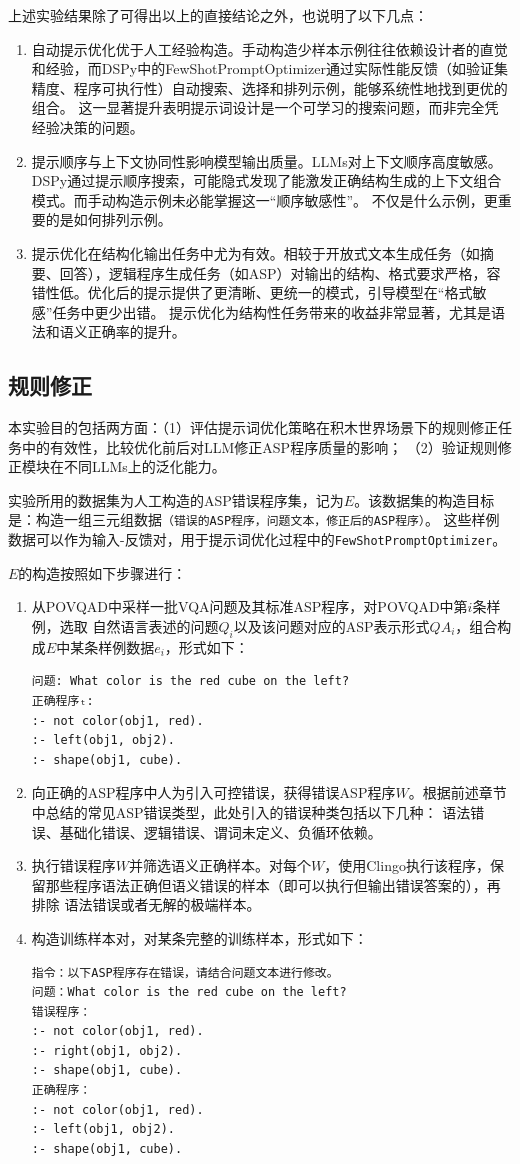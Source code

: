 上述实验结果除了可得出以上的直接结论之外，也说明了以下几点：
\begin{enumerate}[nosep]
\item 自动提示优化优于人工经验构造。手动构造少样本示例往往依赖设计者的直觉和经验，而DSPy中的FewShotPromptOptimizer通过实际性能反馈（如验证集精度、程序可执行性）自动搜索、选择和排列示例，能够系统性地找到更优的组合。
这一显著提升表明提示词设计是一个可学习的搜索问题，而非完全凭经验决策的问题。
\item 提示顺序与上下文协同性影响模型输出质量。LLMs对上下文顺序高度敏感。DSPy通过提示顺序搜索，可能隐式发现了能激发正确结构生成的上下文组合模式。而手动构造示例未必能掌握这一“顺序敏感性”。
不仅是什么示例，更重要的是如何排列示例。
\item 提示优化在结构化输出任务中尤为有效。相较于开放式文本生成任务（如摘要、回答），逻辑程序生成任务（如ASP）对输出的结构、格式要求严格，容错性低。优化后的提示提供了更清晰、更统一的模式，引导模型在“格式敏感”任务中更少出错。
提示优化为结构性任务带来的收益非常显著，尤其是语法和语义正确率的提升。
\end{enumerate}
\subsection{规则修正}
本实验目的包括两方面：（1）评估提示词优化策略在积木世界场景下的规则修正任务中的有效性，比较优化前后对LLM修正ASP程序质量的影响；
（2）验证规则修正模块在不同LLMs上的泛化能力。

实验所用的数据集为人工构造的ASP错误程序集，记为$E$。该数据集的构造目标是：构造一组三元组数据\texttt{（错误的ASP程序，问题文本，修正后的ASP程序）}。
这些样例数据可以作为输入-反馈对，用于提示词优化过程中的\texttt{FewShotPromptOptimizer}。

$E$的构造按照如下步骤进行：
\begin{enumerate}[nosep]
\item 从POVQAD中采样一批VQA问题及其标准ASP程序，对POVQAD中第$i$条样例，选取
自然语言表述的问题$Q_i$以及该问题对应的ASP表示形式$QA_i$，组合构成$E$中某条样例数据$e_i$，形式如下：
\begin{lstlisting}
问题: What color is the red cube on the left?
正确程序ₜ:
:- not color(obj1, red).
:- left(obj1, obj2).
:- shape(obj1, cube).
\end{lstlisting}
\item 向正确的ASP程序中人为引入可控错误，获得错误ASP程序$W$。根据前述章节中总结的常见ASP错误类型，此处引入的错误种类包括以下几种：
语法错误、基础化错误、逻辑错误、谓词未定义、负循环依赖。
\item 执行错误程序$W$并筛选语义正确样本。对每个$W$，使用Clingo执行该程序，保留那些程序语法正确但语义错误的样本（即可以执行但输出错误答案的），再排除
语法错误或者无解的极端样本。
\item 构造训练样本对，对某条完整的训练样本，形式如下：
\begin{lstlisting}
指令：以下ASP程序存在错误，请结合问题文本进行修改。
问题：What color is the red cube on the left?
错误程序：
:- not color(obj1, red).
:- right(obj1, obj2). 
:- shape(obj1, cube).
正确程序：
:- not color(obj1, red).
:- left(obj1, obj2).
:- shape(obj1, cube).
\end{lstlisting}
\end{enumerate}

